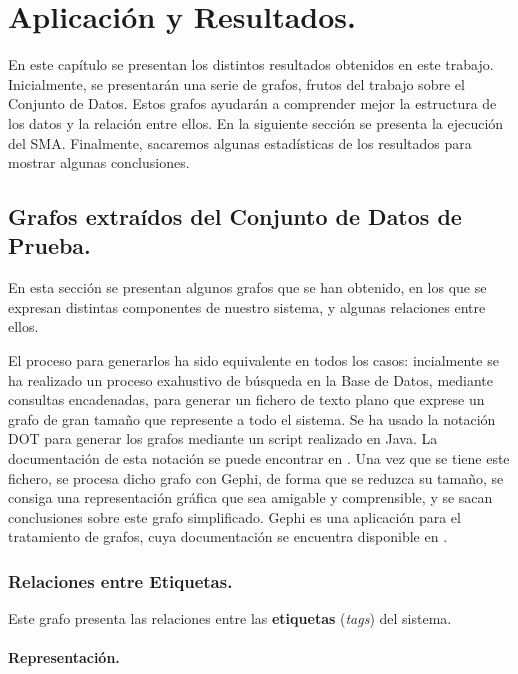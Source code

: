 \chapter{Aplicación y Resultados.}\label{cap:capitulo7}

En este capítulo se presentan los distintos resultados obtenidos en este trabajo. Inicialmente, se presentarán una serie de grafos, frutos del trabajo sobre el Conjunto de Datos. Estos grafos ayudarán a comprender mejor la estructura de los datos y la relación entre ellos. En la siguiente sección se presenta la ejecución del SMA. Finalmente, sacaremos algunas estadísticas de los resultados para mostrar algunas conclusiones.

\section{Grafos extraídos del Conjunto de Datos de Prueba.}

En esta sección se presentan algunos grafos que se han obtenido, en los que se expresan distintas componentes de nuestro sistema, y algunas relaciones entre ellos.

El proceso para generarlos ha sido equivalente en todos los casos: incialmente se ha realizado un proceso exahustivo de búsqueda en la Base de Datos, mediante consultas encadenadas, para generar un fichero de texto plano que exprese un grafo de gran tamaño que represente a todo el sistema. Se ha usado la notación DOT para generar los grafos mediante un script realizado en Java. La documentación de esta notación se puede encontrar en \cite{dot}. Una vez que se tiene este fichero, se procesa dicho grafo con Gephi, de forma que se reduzca su tamaño, se consiga una representación gráfica que sea amigable y comprensible, y se sacan conclusiones sobre este grafo simplificado. Gephi es una aplicación para el tratamiento de grafos, cuya documentación se encuentra disponible en \cite{gephi}.

\subsection{Relaciones entre Etiquetas.}

Este grafo presenta las relaciones entre las {\bf etiquetas} (\emph{tags}) del sistema.

\subsubsection{Representación.}

